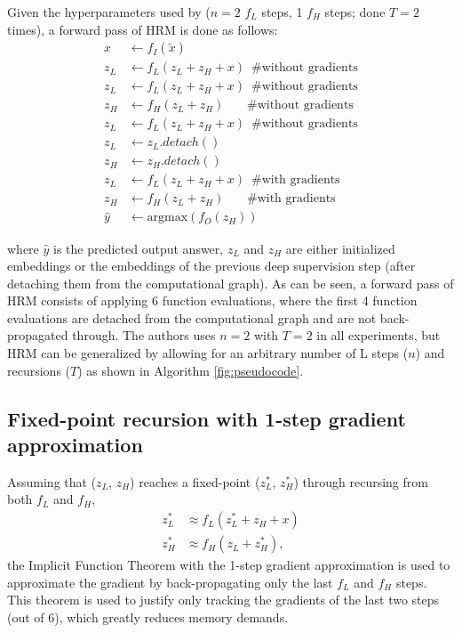 \documentclass{article}
\theoremstyle{plain}
\theoremstyle{definition}
\theoremstyle{remark}
\begin{document}
Given the hyperparameters used by \citet{wang2025hierarchical} ($n=2$ $f_L$ steps, 1 $f_H$ steps; done $T=2$ times), a forward pass of HRM is done as follows:
\begin{align*}
x &\gets f_I(\tilde{x}) \\
    z_L &\gets f_L\left( z_L + z_H + x \right) \hspace{6pt} \text{\# without gradients} \\
    z_L &\gets f_L\left( z_L + z_H + x \right)\hspace{6pt} \text{\# without gradients} \\
    z_H &\gets f_H\left( z_L + z_H \right)\hspace{22pt} \text{\# without gradients} \\
    z_L &\gets f_L\left( z_L + z_H + x \right)\hspace{6pt} \text{\# without gradients} \\
    z_L &\gets z_L.detach() \\
    z_H &\gets z_H.detach() \\
z_L &\gets f_L\left( z_L + z_H + x \right) \hspace{6pt} \text{\# with gradients} \\
z_H &\gets f_H\left( z_L + z_H \right) \hspace{22pt}\text{\# with gradients} \\
\hat{y} &\gets \text{argmax}(f_O\left( z_H \right))
\end{align*}

where $\hat{y}$ is the predicted output answer, $z_L$ and $z_H$ are either initialized embeddings or the embeddings of the previous deep supervision step (after detaching them from the computational graph). As can be seen, a forward pass of HRM consists of applying 6 function evaluations, where the first 4 function evaluations are detached from the computational graph and are not back-propagated through. The authors uses  $n=2$ with $T=2$ in all experiments, but HRM can be generalized by allowing for an arbitrary number of L steps ($n$) and recursions ($T$) as shown in Algorithm \ref{fig:pseudocode}.

\subsection{Fixed-point recursion with 1-step gradient approximation}

Assuming that ($z_L$, $z_H$) reaches a fixed-point ($z_L^{*}$, $z_H^{*}$) through recursing from both $f_L$ and $f_H$,
\begin{align*}
z_L^{*} &\approx f_L\left( z_L^{*} + z_H + x \right) \\
z_H^{*} &\approx f_H\left( z_L + z_H^{*} \right),
\end{align*}
the Implicit Function Theorem \citep{krantz2002implicit} with the 1-step gradient approximation \citep{bai2019deep} is used to approximate the gradient by back-propagating only the last $f_L$ and $f_H$ steps. 
This theorem is used to justify only tracking the gradients of the last two steps (out of 6), which greatly reduces memory demands.
\end{document}
